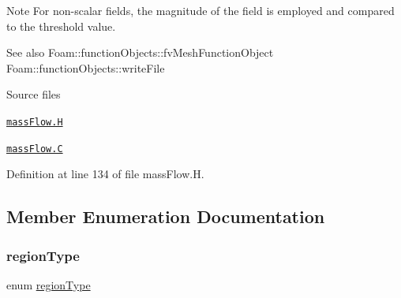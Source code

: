 \begin{DoxyNote}{Note}
For non-\/scalar fields, the magnitude of the field is employed and compared to the threshold value.
\end{DoxyNote}
\begin{DoxySeeAlso}{See also}
Foam\+::function\+Objects\+::fv\+Mesh\+Function\+Object Foam\+::function\+Objects\+::write\+File
\end{DoxySeeAlso}
\begin{DoxyParagraph}{Source files}

\begin{DoxyItemize}
\item \href{../../../home/carlo/data/GeN-Foam/GeN-Foam_ffn/GeN-Foam/GeN-Foam/classes/thermalHydraulics/src/functionObjects/massFlow/massFlow.H}{\tt mass\+Flow.\+H} 
\item \href{../../../home/carlo/data/GeN-Foam/GeN-Foam_ffn/GeN-Foam/GeN-Foam/classes/thermalHydraulics/src/functionObjects/massFlow/massFlow.C}{\tt mass\+Flow.\+C} 
\end{DoxyItemize}
\end{DoxyParagraph}


Definition at line 134 of file mass\+Flow.\+H.



\subsection{Member Enumeration Documentation}
\mbox{\label{classFoam_1_1functionObjects_1_1massFlow_a2c25b4a3d851e2d45d7a435a73598323}} 
\subsubsection{\texorpdfstring{region\+Type}{regionType}}
{\footnotesize\ttfamily enum \hyperlink{classFoam_1_1functionObjects_1_1massFlow_a2c25b4a3d851e2d45d7a435a73598323}{region\+Type}}

